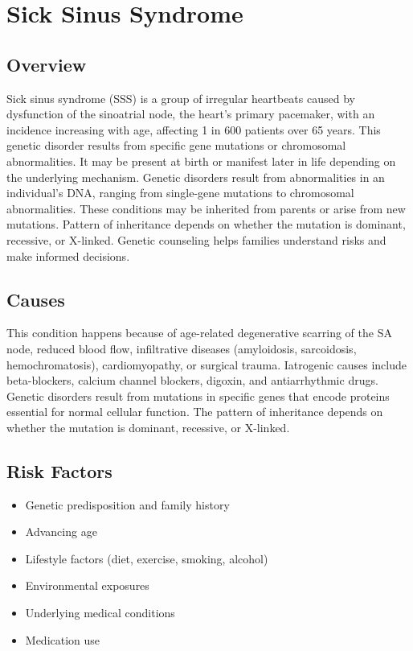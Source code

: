 \chapter{Sick Sinus Syndrome}
\label{sec:Sick Sinus Syndrome}

\section{Overview}
Sick sinus syndrome (SSS) is a group of irregular heartbeats caused by dysfunction of the sinoatrial node, the heart's primary pacemaker, with an incidence increasing with age, affecting 1 in 600 patients over 65 years. This genetic disorder results from specific gene mutations or chromosomal abnormalities. It may be present at birth or manifest later in life depending on the underlying mechanism. Genetic disorders result from abnormalities in an individual's DNA, ranging from single-gene mutations to chromosomal abnormalities. These conditions may be inherited from parents or arise from new mutations. Pattern of inheritance depends on whether the mutation is dominant, recessive, or X-linked. Genetic counseling helps families understand risks and make informed decisions.
\section{Causes}
This condition happens because of age-related degenerative scarring of the SA node, reduced blood flow, infiltrative diseases (amyloidosis, sarcoidosis, hemochromatosis), cardiomyopathy, or surgical trauma. Iatrogenic causes include beta-blockers, calcium channel blockers, digoxin, and antiarrhythmic drugs. Genetic disorders result from mutations in specific genes that encode proteins essential for normal cellular function. The pattern of inheritance depends on whether the mutation is dominant, recessive, or X-linked.   
\section{Risk Factors}

\begin{itemize}[noitemsep]
  \item Genetic predisposition and family history
  \item Advancing age
  \item Lifestyle factors (diet, exercise, smoking, alcohol)
  \item Environmental exposures
  \item Underlying medical conditions
  \item Medication use
\end{itemize}

